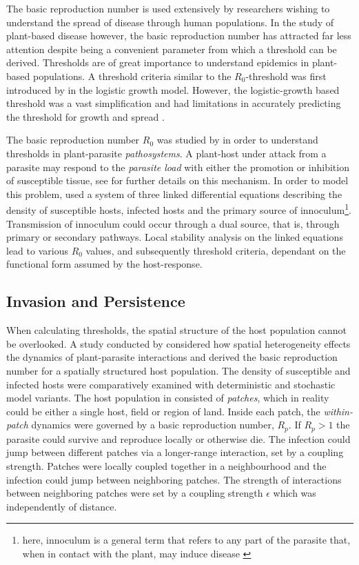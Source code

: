 The basic reproduction number is used extensively by researchers wishing to understand the spread of disease through human populations. In the study of plant-based disease however, the basic reproduction number has attracted far less attention despite being a convenient parameter from which a threshold can be derived. Thresholds are of great importance to understand epidemics in plant-based populations. A threshold criteria similar to the $R_0$-threshold was first introduced by \cite{van2013plant} in the logistic growth model. However, the logistic-growth based threshold was a vast simplification and had limitations in accurately predicting the threshold for growth and spread \cite{onstad1992evaluation}.

The basic reproduction number $R_0$ was studied by \cite{gubbins2000population} in order to understand thresholds in plant-parasite \textit{pathosystems}. A plant-host under attack from a parasite may respond to the \textit{parasite load} with either the promotion or inhibition of susceptible tissue, see \cite{gilligan1997analysis} for further details on this mechanism. In order to model this problem, \cite{gubbins2000population} used a system of three linked differential equations describing the density of susceptible hosts, infected hosts and the primary source of innoculum\footnote{\textemdash here, innoculum is a general term that refers to any part of the parasite that, when in contact with the plant, may induce disease \cite{agrios2005chapter}}. Transmission of innoculum could occur through a dual source, that is, through primary or secondary pathways. Local stability analysis on the linked equations lead to various $R_0$ values, and subsequently threshold criteria, dependant on the functional form assumed by the host-response.\\

\subsection{Invasion and Persistence}
\label{ch3:invasions_and_persistence}
When calculating thresholds, the spatial structure of the host population cannot be overlooked. A study conducted by \cite{park2001invasion} considered how spatial heterogeneity effects the dynamics of plant-parasite interactions and derived the basic reproduction number for a spatially structured host population. The density of susceptible and infected hosts were comparatively examined with deterministic and stochastic model variants. The host population in \cite{park2001invasion} consisted of \textit{patches}, which in reality could be either a single host, field or region of land. Inside each patch, the \textit{within-patch} dynamics were governed by a basic reproduction number, $R_p$. If $R_p > 1$ the parasite could survive and reproduce locally or otherwise die. The infection could jump between different patches via a longer-range interaction, set by a coupling strength. Patches were locally coupled together in a neighbourhood and the infection could jump between neighboring patches. The strength of interactions between neighboring patches were set by a coupling strength $\epsilon$ which was independently of distance.

